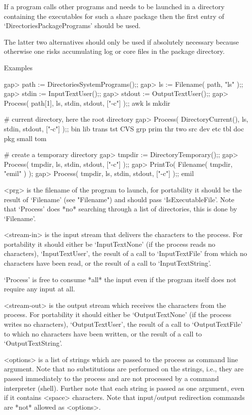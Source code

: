 If a program calls other programs and needs to be launched in a directory
containing the executables for such a share package then  the first entry of
`DirectoriesPackagePrograms' should be used.

The latter  two alternatives should only  be used if absolutely necessary
because otherwise one risks accumulating log or core files in the package
directory.

Examples

\beginexample
gap> path := DirectoriesSystemPrograms();;
gap> ls := Filename( path, "ls" );;
gap> stdin := InputTextUser();;
gap> stdout := OutputTextUser();;
gap> Process( path[1], ls, stdin, stdout, ["-c"] );;
awk    ls     mkdir

# current directory, here the root directory
gap> Process( DirectoryCurrent(), ls, stdin, stdout, ["-c"] );;
bin    lib    trans  tst    CVS    grp    prim   thr    two
src    dev    etc    tbl    doc    pkg    small  tom

# create a temporary directory
gap> tmpdir := DirectoryTemporary();;                          
gap> Process( tmpdir, ls, stdin, stdout, ["-c"] );;            
gap> PrintTo( Filename( tmpdir, "emil" ) );
gap> Process( tmpdir, ls, stdin, stdout, ["-c"] );;
emil
\endexample

<prg> is the filename of the program to launch, for portability it should
be   the  result  of   `Filename'   (see   "Filename") and   should  pass
`IsExecutableFile'.  Note that  `Process'  does *no* searching through  a
list of directories, this is done by `Filename'.

<stream-in>  is the  input stream   that  delivers the characters  to the
process.   For portability it  should either  be `InputTextNone' (if  the
process reads  no characters), `InputTextUser',
the  result  of a call to `InputTextFile'  from which  no characters have
been read, or the result of a call to `InputTextString'.

`Process' is  free to consume *all* the  input even if the program itself
does not require any input at all.

<stream-out> is the output stream  which receives the characters from the
process.  For portability it should   either be `OutputTextNone' (if  the
process writes no characters), `OutputTextUser',
the result of a call to `OutputTextFile' to which no characters have been
written, or the result of a call to `OutputTextString'.

<options> is a list of strings which are passed to the process as command
line argument.  Note that no substitutions are  performed on the strings,
i.e., they are passed immediately to the process and are not processed by
a command interpreter (shell).   Further note that  each string is passed
as one  argument,  even if it  contains  <space>  characters.  Note  that
input/output redirection commands are *not* allowed as <options>.

